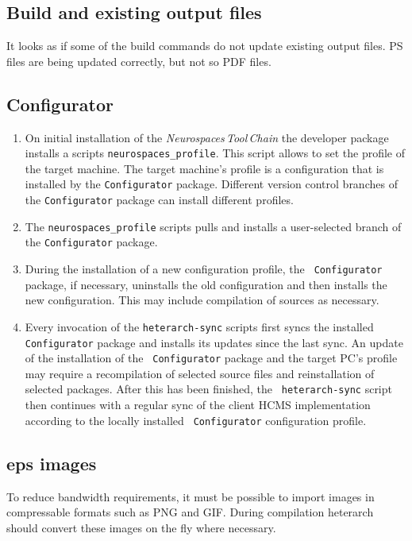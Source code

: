 \documentclass[12pt]{article}
\begin{document}
\subsection{Build and existing output files}

It looks as if some of the build commands do not update existing
output files.  PS files are being updated correctly, but not so PDF
files.


\subsection{Configurator}

\begin{enumerate}
\item On initial installation of the {\it Neurospaces\,Tool\,Chain}
  the developer package installs a scripts {\tt neurospaces\_profile}.
  This script allows to set the profile of the target machine.  The
  target machine's profile is a configuration that is installed by the
  {\tt Configurator} package.  Different version control branches of
  the {\tt Configurator} package can install different profiles.
\item The {\tt neurospaces\_profile} scripts pulls and installs a
  user-selected branch of the {\tt Configurator} package.
\item During the installation of a new configuration profile, the {\tt
    Configurator} package, if necessary, uninstalls the old
  configuration and then installs the new configuration.  This may
  include compilation of sources as necessary.
\item Every invocation of the {\tt heterarch-sync} scripts first syncs
  the installed {\tt Configurator} package and installs its updates
  since the last sync.  An update of the installation of the {\tt
    Configurator} package and the target PC's profile may require a
  recompilation of selected source files and reinstallation of
  selected packages.  After this has been finished, the {\tt
    heterarch-sync} script then continues with a regular sync of the
  client HCMS implementation according to the locally installed {\tt
    Configurator} configuration profile.
\end{enumerate}

\subsection{eps images}

To reduce bandwidth requirements, it must be possible to import images
in compressable formats such as PNG and GIF.  During compilation
heterarch should convert these images on the fly where necessary.
\end{document}
